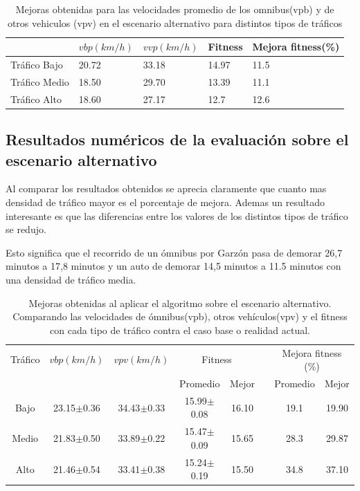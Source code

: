 \begin{table}[H]
	\renewcommand{\arraystretch}{1.2}
	\caption{Mejoras obtenidas para las velocidades promedio de los omnibus(vpb) y de otros vehiculos (vpv) en el escenario alternativo para distintos tipos de tráficos }
	\label{table:mejoras_trafico_alternativo}
	\centering
	\begin{tabular}{p{3.5cm}p{2.5cm}p{2.5cm}p{2cm}p{2cm} }
		\hline
		&
		$vbp(km/h)$& 
		$vvp(km/h)$ & 
		Fitness &
		Mejora fitness(\%)
		\\ 
		\hline

		Tráfico Bajo & 20.72  & 33.18 & 14.97 & 11.5\\
		Tráfico Medio & 18.50  & 29.70& 13.39 & 11.1 \\
		Tráfico Alto  & 18.60  & 27.17& 12.7 & 12.6\\		
		\hline
	\end{tabular}
\end{table}

\subsection{Resultados numéricos de la evaluación sobre el escenario alternativo}

Al comparar los resultados obtenidos se aprecia claramente que cuanto mas densidad de tráfico mayor es el porcentaje de mejora. Ademas un resultado interesante es que las diferencias entre los valores de los distintos tipos de tráfico se redujo.

Esto significa que el recorrido de un ómnibus por Garzón pasa de demorar 26,7 minutos a 17,8 minutos y un auto de demorar 14,5 minutos a 11.5 minutos con una densidad de tráfico media. 



\begin{table}[h]
	\renewcommand{\arraystretch}{1.2}
	\caption{Mejoras obtenidas al aplicar el algoritmo sobre el escenario alternativo. Comparando las velocidades de ómnibus(vpb), otros vehículos(vpv) y el fitness con cada tipo de tráfico contra el caso base o realidad actual.}
	\label{table:mejoras_trafico_alternativo_algoritmo}
	\centering
	\begin{tabular}{cccccccc}
		\hline 
		Tráfico& 
		$vbp(km/h)$& 
		$vpv(km/h)$&
		\multicolumn{2}{c}{Fitness}&  & 
		\multicolumn{2}{c}{Mejora fitness (\%)}\\  \cline{4-5} \cline{7-8}&     &     & \multicolumn{1}{c}{Promedio} & \multicolumn{1}{c}{Mejor} &  & \multicolumn{1}{c}{Promedio} & \multicolumn{1}{c}{Mejor} \\ \hline

		Bajo & 23.15$\pm$0.36 & 34.43$\pm$0.33 & 15.99$\pm$0.08 & 16.10 & & 19.1& 19.90 \\
		Medio & 21.83$\pm$0.50  & 33.89$\pm$0.22 & 15.47$\pm$0.09& 15.65 & & 28.3 & 29.87\\
		Alto & 21.46$\pm$0.54  & 33.41$\pm$0.38 & 15.24$\pm$0.19& 15.50 & & 34.8 & 37.10\\			    
	\end{tabular}
\end{table}


